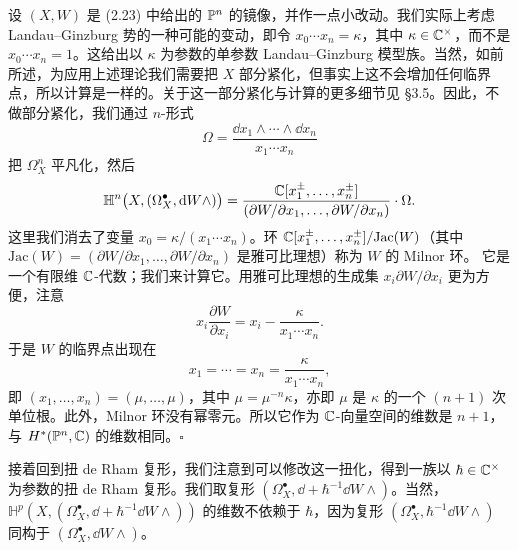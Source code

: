 \begin{example}
设 $(X,W)$ 是 (2.23) 中给出的 $\mathbb{P}^n$ 的镜像，并作一点小改动。我们实际上考虑 Landau–Ginzburg 势的一种可能的变动，即令 $x_0\cdots x_n=\kappa$，其中 $\kappa\in\mathbb{C}^\times$，而不是 $x_0\cdots x_n=1$。这给出以 $\kappa$ 为参数的单参数 Landau–Ginzburg 模型族。当然，如前所述，为应用上述理论我们需要把 $X$ 部分紧化，但事实上这不会增加任何临界点，所以计算是一样的。关于这一部分紧化与计算的更多细节见 §3.5。因此，不做部分紧化，我们通过 $n$-形式
\[
\Omega=\frac{\dd x_1\wedge\cdots\wedge\dd x_n}{x_1\cdots x_n}
\]
把 $\Omega^n_X$ 平凡化，然后
\[
\mathbb{H}^n\bigl(X,(\Omega^\bullet_X,\mathrm{d} W\wedge)\bigr)=\frac{\mathbb{C}[x_1^{\pm},\dots,x_n^{\pm}]}{(\partial W/\partial x_1,\dots,\partial W/\partial x_n)}\cdot\Omega.
\]
这里我们消去了变量 $x_0=\kappa/(x_1\cdots x_n)$。环 $\mathbb{C}[x_1^{\pm},\dots,x_n^{\pm}]/\mathrm{Jac}(W)$（其中 $\mathrm{Jac}(W)=(\partial W/\partial x_1,\dots,\partial W/\partial x_n)$ 是雅可比理想）称为 $W$ 的 Milnor 环。
它是一个有限维 $\mathbb{C}$-代数；我们来计算它。用雅可比理想的生成集 $x_i\partial W/\partial x_i$ 更为方便，注意
\[
x_i\frac{\partial W}{\partial x_i}=x_i-\frac{\kappa}{x_1\cdots x_n}.
\]
于是 $W$ 的临界点出现在
\[
x_1=\cdots=x_n=\frac{\kappa}{x_1\cdots x_n},
\]
即 $(x_1,\dots,x_n)=(\mu,\dots,\mu)$，其中 $\mu=\mu^{-n}\kappa$，亦即 $\mu$ 是 $\kappa$ 的一个 $(n+1)$ 次单位根。此外，Milnor 环没有幂零元。所以它作为 $\mathbb{C}$-向量空间的维数是 $n+1$，与 $H^*(\mathbb{P}^n,\mathbb{C})$ 的维数相同。\hfill$\square$
\end{example}


接着回到扭 de Rham 复形，我们注意到可以修改这一扭化，得到一族以 $\hbar\in\mathbb{C}^\times$ 为参数的扭 de Rham 复形。我们取复形 $(\Omega^\bullet_X,\dd+\hbar^{-1}\dd W\wedge)$。当然，$\mathbb{H}^p(X,(\Omega^\bullet_X,\dd+\hbar^{-1}\dd W\wedge))$ 的维数不依赖于 $\hbar$，因为复形 $(\Omega^\bullet_X,\hbar^{-1}\dd W\wedge)$ 同构于 $(\Omega^\bullet_X,\dd W\wedge)$。

